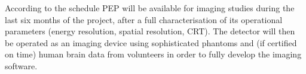 According to the schedule PEP will be available for imaging studies during the last six months of the project, after a full characterisation of its operational parameters (energy resolution, spatial resolution, CRT). The detector will then be operated as an imaging device using sophisticated phantoms and (if certified on time) human brain data from volunteers in order to fully  develop the imaging software.  





